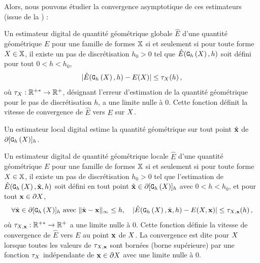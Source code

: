 Alors, nous pouvons étudier la convergence asymptotique de ces estimateurs
(issue de la ) :
%
\begin{definition}{}
  \label{def:multigrid-convergence-global}
  Un estimateur digital de quantité géométrique globale $\hat{E}$ d'une quantité
  géométrique $E$  pour une famille de
  formes $\mathbb{X}$ si et seulement si pour toute forme $X \in \mathbb{X}$, il
  existe un pas de discrétisation $h_0 > 0$ tel que
  $\hat{E}(\mathtt{G}_{h}\left(X\right),h)$ soit défini pour tout $0 < h < h_0$,
  \begin{equation}
    | \hat{E}(\mathtt{G}_{h}\left(X\right),h) - E(X) | \le \tau_{X}(h) \,,
  \end{equation}
  où $\tau_{X}: \mathbb{R}^{+*} \rightarrow \mathbb{R}^+$, désignant l'erreur d'estimation
  de la quantité géométrique pour le pas de discrétisation $h$, a une limite
  nulle à $0$. Cette fonction définit la vitesse de convergence de $\hat{E}$
  vers $E$ sur $X$.
\end{definition}
%
%
Un estimateur local digital estime la quantité géométrique sur tout point
$\hat{\mathbf{x}}$ de $\partial\lbrack \mathtt{G}_{h}\left(X\right) \rbrack_{h}$.
%
\begin{definition}{}
  \label{def:multigrid-convergence-local}
  Un estimateur digital de quantité géométrique locale $\hat{E}$ d'une quantité géométrique
  $E$  pour une famille de formes $\mathbb{X}$ si
  et seulement si pour toute forme $X \in \mathbb{X}$, il existe un pas de
  discrétisation $h_0 > 0$ tel que l'estimation de $\hat{E}(\mathtt{G}_{h}\left(X\right),\hat{\mathbf{x}},h)$
  soit défini en tout point $\hat{\mathbf{x}} \in \partial \lbrack \mathtt{G}_{h}\left(X\right) \rbrack_{h}$ avec $0 < h < h_0$,
  et pour tout $\mathbf{x} \in \partial X$,
  \begin{equation}
    \forall \hat{\mathbf{x}} \in \partial\lbrack \mathtt{G}_{h}\left(X\right) \rbrack_{h} \text{~avec~} \| \hat{\mathbf{x}} -\mathbf{x}\|_\infty
    \le h, \quad | \hat{E}(\mathtt{G}_{h}\left(X\right),\hat{\mathbf{x}},h) - E(X,\mathbf{x}) | \le \tau_{X,\mathbf{x}}(h) \,,
  \end{equation}
  où $\tau_{X,\mathbf{x}}: \mathbb{R}^{+*} \rightarrow \mathbb{R}^+$ a une limite
  nulle à $0$. Cette fonction définie la vitesse de convergence de $\hat{E}$
  vers $E$ au point $\mathbf{x}$ de $X$. La convergence est dite
   pour $X$ lorsque toutes les valeurs de
  $\tau_{X,\mathbf{x}}$ sont bornées (borne supérieure) par une fonction
  $\tau_{X}$ indépendante de $\mathbf{x} \in \partial X$ avec une limite nulle à $0$.
\end{definition}

